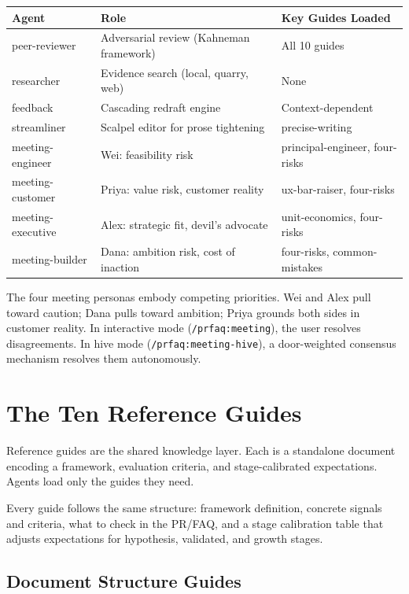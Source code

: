 \documentclass[11pt,letterpaper]{article}
\begin{document}
\begin{table}[h]
\centering
\small
\begin{tabular}{@{}lll@{}}
\toprule
\textbf{Agent} & \textbf{Role} & \textbf{Key Guides Loaded} \\
\midrule
peer-reviewer     & Adversarial review (Kahneman framework)     & All 10 guides \\
researcher        & Evidence search (local, quarry, web)         & None \\
feedback          & Cascading redraft engine                     & Context-dependent \\
streamliner       & Scalpel editor for prose tightening          & precise-writing \\
meeting-engineer  & Wei: feasibility risk                        & principal-engineer, four-risks \\
meeting-customer  & Priya: value risk, customer reality          & ux-bar-raiser, four-risks \\
meeting-executive & Alex: strategic fit, devil's advocate        & unit-economics, four-risks \\
meeting-builder   & Dana: ambition risk, cost of inaction        & four-risks, common-mistakes \\
\bottomrule
\end{tabular}
\end{table}

The four meeting personas embody competing priorities. Wei and Alex pull toward
caution; Dana pulls toward ambition; Priya grounds both sides in customer
reality. In interactive mode (\texttt{/prfaq:meeting}), the user resolves
disagreements. In hive mode (\texttt{/prfaq:meeting-hive}), a door-weighted
consensus mechanism resolves them autonomously.

\section{The Ten Reference Guides}

Reference guides are the shared knowledge layer. Each is a standalone document
encoding a framework, evaluation criteria, and stage-calibrated expectations.
Agents load only the guides they need.

Every guide follows the same structure: framework definition, concrete
signals and criteria, what to check in the PR/FAQ, and a stage calibration table
that adjusts expectations for hypothesis, validated, and growth stages.

\subsection{Document Structure Guides}
\end{document}
